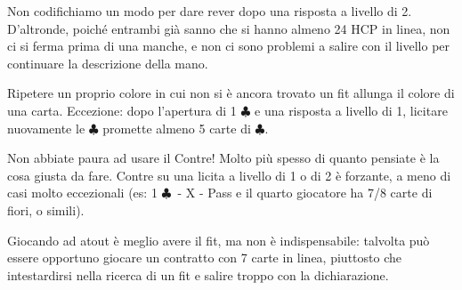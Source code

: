 \documentclass[a4paper,10pt]{article}
\renewcommand{\c}{$\clubsuit$\xspace}
\newcommand{\smallspace}{\vskip0.3cm}
\begin{document}
\smallspace

Non codifichiamo un modo per dare rever dopo una risposta a livello di 2. D'altronde, poiché entrambi già sanno che si hanno almeno 24 HCP in linea, non ci si ferma prima di una manche, e non ci sono problemi a salire con il livello per continuare la descrizione della mano.

\smallspace


Ripetere un proprio colore in cui non si è ancora trovato un fit allunga il colore di una carta. Eccezione: dopo l'apertura di 1 \c e una risposta a livello di 1, licitare nuovamente le \c promette almeno 5 carte di \c.

\smallspace

Non abbiate paura ad usare il Contre! Molto più spesso di quanto pensiate è la cosa giusta da fare. Contre su una licita a livello di 1 o di 2 è forzante, a meno di casi molto eccezionali (es: 1 \c\ - X - Pass e il quarto giocatore ha 7/8 carte di fiori, o simili).

\smallspace

Giocando ad atout è meglio avere il fit, ma non è indispensabile: talvolta può essere opportuno giocare un contratto con 7 carte in linea, piuttosto che intestardirsi nella ricerca di un fit e salire troppo con la dichiarazione.
\end{document}
